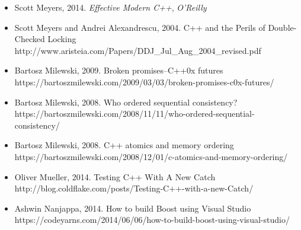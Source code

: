 \begin{itemize}

\item Scott Meyers, 2014. \textit{Effective Modern C++}, \textit{O’Reilly}



\item Scott Meyers and Andrei Alexandrescu, 2004. C++ and the Perils of Double-Checked Locking http://\allowbreak{}www.\allowbreak{}aristeia.\allowbreak{}com/\allowbreak{}Papers/\allowbreak{}DDJ\_\allowbreak{}Jul\_\allowbreak{}Aug\_\allowbreak{}2004\_\allowbreak{}revised.\allowbreak{}pdf



\item Bartosz Milewski, 2009. Broken promises–C++0x futures https://\allowbreak{}bartoszmilewski.\allowbreak{}com/\allowbreak{}2009/\allowbreak{}03/\allowbreak{}03/\allowbreak{}broken-\allowbreak{}promises-\allowbreak{}c0x-\allowbreak{}futures/



\item Bartosz Milewski, 2008. Who ordered sequential consistency? https://\allowbreak{}bartoszmilewski.\allowbreak{}com/\allowbreak{}2008/\allowbreak{}11/\allowbreak{}11/\allowbreak{}who-\allowbreak{}ordered-\allowbreak{}sequential-\allowbreak{}consistency/



\item Bartosz Milewski, 2008. C++ atomics and memory ordering https://\allowbreak{}bartoszmilewski.\allowbreak{}com/\allowbreak{}2008/\allowbreak{}12/\allowbreak{}01/\allowbreak{}c-\allowbreak{}atomics-\allowbreak{}and-\allowbreak{}memory-\allowbreak{}ordering/



\item Oliver Mueller, 2014. Testing C++ With A New Catch http://\allowbreak{}blog.\allowbreak{}coldflake.\allowbreak{}com/\allowbreak{}posts/\allowbreak{}Testing-\allowbreak{}C++-\allowbreak{}with-\allowbreak{}a-\allowbreak{}new-\allowbreak{}Catch/



\item Ashwin Nanjappa, 2014. How to build Boost using Visual Studio https://\allowbreak{}codeyarns.\allowbreak{}com/\allowbreak{}2014/\allowbreak{}06/\allowbreak{}06/\allowbreak{}how-\allowbreak{}to-\allowbreak{}build-\allowbreak{}boost-\allowbreak{}using-\allowbreak{}visual-\allowbreak{}studio/



\end{itemize}
